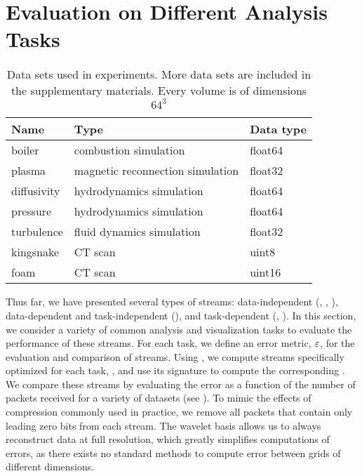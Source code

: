 \section{Evaluation on Different Analysis Tasks} \label{sec:analysis-tasks}

\begin{table}[t] \caption{Data sets used in experiments. More data sets are included in the
	supplementary materials. Every volume is of dimensions $64^3$}
  \centering
	\begin{tabular}{l l l}
  \toprule
  Name & Type & Data type \\
  \midrule
  boiler & combustion simulation& float64\\
  plasma & magnetic reconnection simulation& float32\\
  diffusivity & hydrodynamics simulation& float64\\
  pressure & hydrodynamics simulation& float64\\
	turbulence & fluid dynamics simulation& float32\\
	kingsnake & CT scan & uint8\\
	foam & CT scan & uint16\\
  \bottomrule
  \end{tabular}\label{tbl:data-sets}
\end{table}

Thus far, we have presented several types of streams: data-independent (\slvl, \sbit, \swav),
data-dependent and task-independent (\smag), and task-dependent (\sopt, \ssig). In this section, we
consider a variety of common analysis and visualization tasks to evaluate the performance of these
streams. For each task, we define an error metric, $\err$, for the evaluation and comparison of
streams. Using , we compute streams specifically optimized for each task, \stkop,
and use its signature to compute the corresponding \stksg. We compare these streams by evaluating
the error as a function of the number of packets received for a variety of datasets (see
). To mimic the effects of compression commonly used in practice, we remove all
packets that contain only leading zero bits from each stream. The wavelet basis allows us to always
reconstruct data at full resolution, which greatly simplifies computations of errors, as there
exists no standard methods to compute error between grids of different dimensions.

